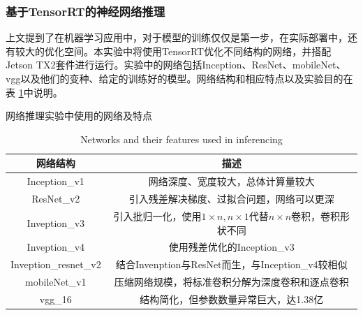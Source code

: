 \subsubsection{基于TensorRT的神经网络推理}
\par 上文提到了在机器学习应用中，对于模型的训练仅仅是第一步，在实际部署中，还有较大的优化空间。本实验中将使用TensorRT优化不同结构的网络，并搭配Jetson TX2套件进行运行。实验中的网络包括Inception、ResNet、mobileNet、vgg以及他们的变种、给定的训练好的模型。网络结构和相应特点以及实验目的在表 \ref{table-NETWORKS}中说明。
\begin{table}
	\centering
	\renewcommand{\thetable}{\arabic{section}-\arabic{table} }
	\renewcommand{\tablename}{表}
	\caption{网络推理实验中使用的网络及特点}
	\addtocounter{table}{-1}
	\renewcommand{\thetable}{\arabic{section}-\arabic{table} }
	\renewcommand{\tablename}{Table}
	\caption{Networks and their features used in inferencing}
	\begin{tabular}{cc}
		\toprule
		网络结构	&	描述\\
		\midrule
		Inception\_v1 & 网络深度、宽度较大，总体计算量较大\\
		ResNet\_v2 & 引入残差解决梯度、过拟合问题，网络可以更深\\
		Inveption\_v3 & 引入批归一化，使用$ 1\times n, n\times 1 $代替$ n\times n $卷积，卷积形状不同\\
		Inveption\_v4 & 使用残差优化的Inception\_v3\\
		Inveption\_resnet\_v2 & 结合Invenption与ResNet而生，与Inception\_v4较相似\\
		mobileNet\_v1 & 压缩网络规模，将标准卷积分解为深度卷积和逐点卷积\\
		vgg\_16 &  结构简化，但参数数量异常巨大，达1.38亿\\
		\bottomrule
	\end{tabular} \label{table-NETWORKS} 
\end{table}
